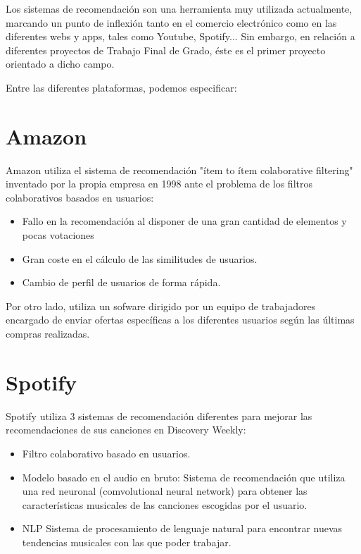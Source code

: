 Los sistemas de recomendación son una herramienta muy utilizada actualmente, marcando un punto de inflexión tanto  en el comercio electrónico   como  en las diferentes webs y apps, tales como Youtube, Spotify... 
Sin embargo, en relación a diferentes proyectos de Trabajo Final de Grado, éste es el primer proyecto orientado a dicho campo. 

Entre las diferentes plataformas, podemos especificar:

\section{Amazon}
Amazon utiliza el sistema de recomendación "ítem to ítem colaborative filtering" inventado por la propia empresa en 1998 ante el problema de los filtros colaborativos basados en usuarios:
\begin{itemize}
\item Fallo en la recomendación al disponer de una gran cantidad de elementos y pocas votaciones
\item Gran coste en el cálculo de las similitudes de usuarios. 
\item Cambio de perfil de usuarios de forma rápida.\nocite{wiki:filter}
\end{itemize}
Por otro lado, utiliza un sofware dirigido por un equipo de trabajadores encargado de enviar ofertas específicas a los diferentes usuarios según las últimas compras realizadas.\nocite{manu:amazon}
\section{Spotify}
Spotify  utiliza 3 sistemas de recomendación diferentes para mejorar las recomendaciones de sus canciones en Discovery Weekly: 
\begin{itemize}
\item Filtro colaborativo basado en usuarios. 
\item Modelo basado en el audio en bruto: Sistema de recomendación que utiliza una red neuronal (comvolutional neural network) para obtener las características musicales de las canciones escogidas por el usuario. 
\item NLP Sistema de procesamiento de lenguaje natural para encontrar nuevas tendencias musicales con las que poder trabajar. \cite{isaac:spotify}
\end{itemize}



